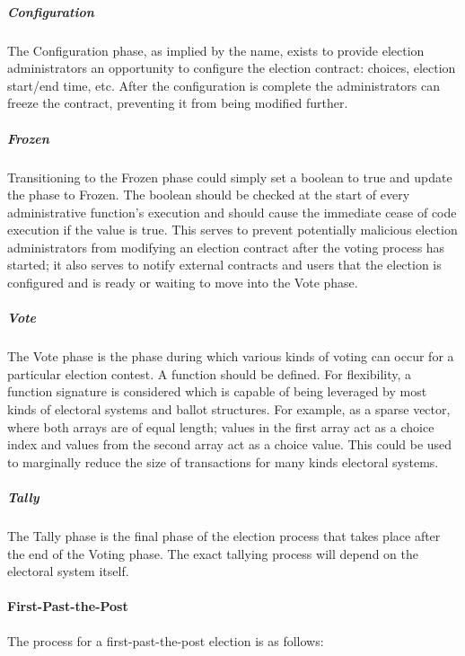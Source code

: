 \subparagraph{Configuration}
The Configuration phase, as implied by the name, exists to provide election
administrators an opportunity to configure the election contract: choices,
election start/end time, etc. After the configuration is complete the
administrators can freeze the contract, preventing it from being modified
further.

\subparagraph{Frozen}
Transitioning to the Frozen phase could simply set a boolean  to
true and update the phase to Frozen. The boolean  should be checked
at the start of every administrative function's execution and should cause the
immediate cease of code execution if the value is true. This serves to prevent
potentially malicious election administrators from modifying an election
contract after the voting process has started; it also serves to notify external
contracts and users that the election is configured and is ready or waiting to
move into the Vote phase.

\subparagraph{Vote}
The Vote phase is the phase during which various kinds of voting can occur for a
particular election contest. A  function should be defined. For
flexibility, a  function signature is considered
which is capable of being leveraged by most kinds of electoral systems and
ballot structures. For example, as a sparse vector, where both arrays are of
equal length; values in the first array act as a choice index and values from
the second array act as a choice value. This could be used to marginally reduce
the size of transactions for many kinds electoral systems.

\subparagraph{Tally}
The Tally phase is the final phase of the election process that takes place
after the end of the Voting phase. The exact tallying process will depend on the
electoral system itself.


\paragraph{First-Past-the-Post}
The process for a first-past-the-post election is as follows:

